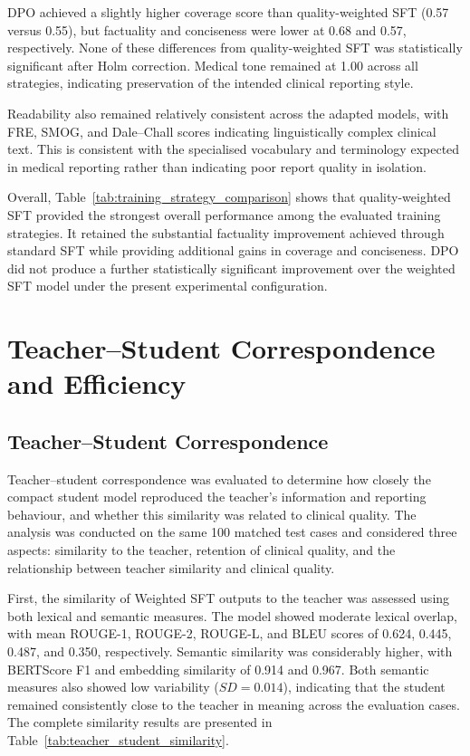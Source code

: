 \documentclass[ %
                    author={Aman Kumar Singh},
                supervisor={Dr. Edwin Simpson},
                    degree={MSc},
                     title={Quality-Aware Knowledge Distillation of Large Language Models for Efficient Personalised Clinical Report Generation},
                  subtitle={},
                      type={},
                      year={2021}]{dissertation}
\begin{document}
DPO achieved a slightly higher coverage score than quality-weighted SFT
(0.57 versus 0.55), but factuality and conciseness were lower at 0.68 and
0.57, respectively. None of these differences from quality-weighted SFT
was statistically significant after Holm correction. Medical tone remained
at 1.00 across all strategies, indicating preservation of the intended
clinical reporting style.

Readability also remained relatively consistent across the adapted models,
with FRE, SMOG, and Dale--Chall scores indicating linguistically complex
clinical text. This is consistent with the specialised vocabulary and
terminology expected in medical reporting rather than indicating poor
report quality in isolation.

Overall, Table~\ref{tab:training_strategy_comparison} shows that
quality-weighted SFT provided the strongest overall performance among the
evaluated training strategies. It retained the substantial factuality
improvement achieved through standard SFT while providing additional gains
in coverage and conciseness. DPO did not produce a further statistically
significant improvement over the weighted SFT model under the present
experimental configuration.
\section{Teacher--Student Correspondence and Efficiency}

\subsection{Teacher--Student Correspondence}
\label{sec:teacher_student_correspondence}

Teacher--student correspondence was evaluated to determine how closely the
compact student model reproduced the teacher's information and reporting
behaviour, and whether this similarity was related to clinical quality. The
analysis was conducted on the same 100 matched test cases and considered
three aspects: similarity to the teacher, retention of clinical quality, and
the relationship between teacher similarity and clinical quality.

First, the similarity of Weighted SFT outputs to the teacher was assessed
using both lexical and semantic measures. The model showed moderate lexical
overlap, with mean ROUGE-1, ROUGE-2, ROUGE-L, and BLEU scores of 0.624,
0.445, 0.487, and 0.350, respectively. Semantic similarity was considerably
higher, with BERTScore F1 and embedding similarity of 0.914 and 0.967.
Both semantic measures also showed low variability ($SD=0.014$), indicating
that the student remained consistently close to the teacher in meaning
across the evaluation cases. The complete similarity results are presented
in Table~\ref{tab:teacher_student_similarity}.
\vspace{-15pt}
\end{document}

